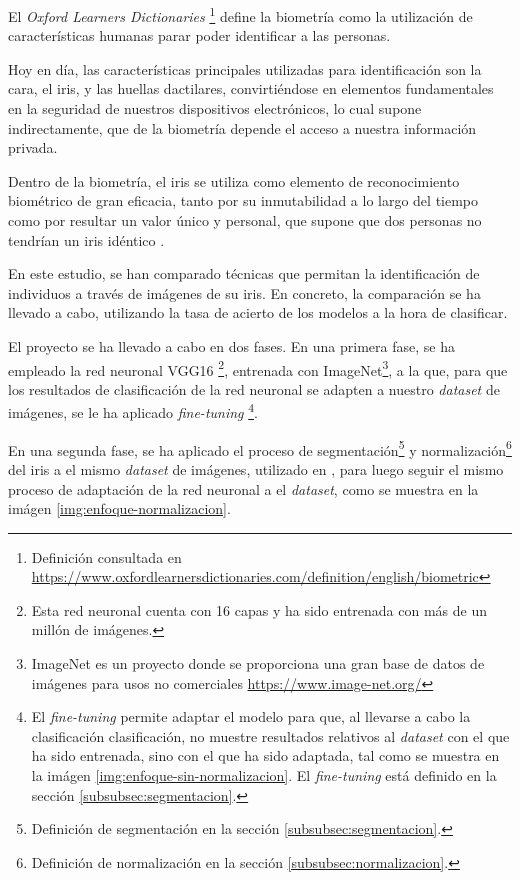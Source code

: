  \label{capitulo1}

El \textit{Oxford Learners Dictionaries} \footnote{Definición consultada en \url{https://www.oxfordlearnersdictionaries.com/definition/english/biometric}} define la biometría como la utilización de características humanas parar poder identificar a las personas.

Hoy en día, las características principales utilizadas para identificación son la cara, el iris, y las huellas dactilares, convirtiéndose en elementos fundamentales     en la seguridad de nuestros dispositivos electrónicos, lo cual supone indirectamente,
que de la biometría depende el acceso a nuestra información privada.

Dentro de la biometría, el iris se utiliza como elemento de reconocimiento biométrico de gran eficacia, tanto por su inmutabilidad a lo largo del tiempo como por resultar un valor único y 
personal, que supone que dos personas no tendrían un iris idéntico \cite{malgheet_iris_2021}. 

En este estudio, se han comparado técnicas que permitan la identificación de individuos a través de imágenes de su iris. 
En concreto, la comparación se ha llevado a cabo, utilizando la tasa de acierto de los modelos a la hora de clasificar. 

El proyecto se ha llevado a cabo en dos fases. En una primera fase, se ha empleado la red neuronal VGG16 \footnote{Esta red neuronal cuenta con 16 capas y ha sido entrenada con más de un millón de imágenes.}, entrenada con ImageNet\footnote{ImageNet es un proyecto donde se proporciona 
una gran base de datos de imágenes para usos no comerciales \url{https://www.image-net.org/}}, a la que, para que los resultados de clasificación de la red neuronal se adapten a nuestro \textit{dataset} de imágenes, se le ha aplicado \textit{fine-tuning} \footnote{El \textit{fine-tuning} 
permite adaptar el modelo para que, al llevarse a cabo la clasificación clasificación, no muestre resultados relativos al \textit{dataset} con el que ha sido entrenada, sino con el que ha sido adaptada, tal como se muestra en la imágen \ref{img:enfoque-sin-normalizacion}. El \textit{fine-tuning} está definido en la sección \ref{subsubsec:segmentacion}.}.



En una segunda fase, se ha aplicado el proceso de segmentación\footnote{Definición de segmentación en la sección \ref{subsubsec:segmentacion}.} y normalización\footnote{Definición de normalización en la sección \ref{subsubsec:normalizacion}.} del iris a el mismo \textit{dataset} de imágenes, utilizado en \cite{tfg_iris_2020}, para luego seguir el mismo proceso de adaptación de la red neuronal
a el \textit{dataset}, como se muestra en la imágen \ref{img:enfoque-normalizacion}.

